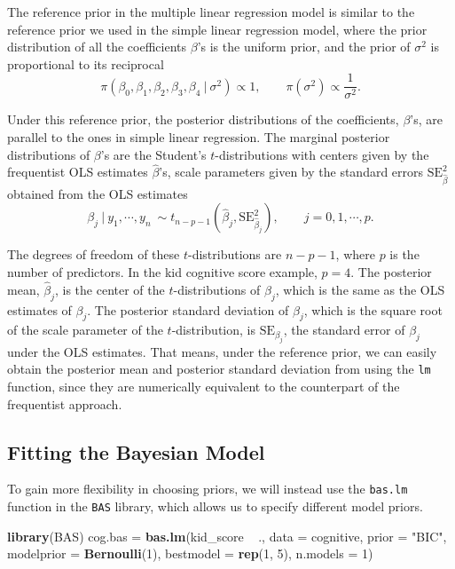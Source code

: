 \documentclass[]{book}
\newenvironment{Shaded}{\begin{snugshade}}{\end{snugshade}}
\newcommand{\KeywordTok}[1]{\textcolor[rgb]{0.13,0.29,0.53}{\textbf{{#1}}}}
\newcommand{\DataTypeTok}[1]{\textcolor[rgb]{0.13,0.29,0.53}{{#1}}}
\newcommand{\DecValTok}[1]{\textcolor[rgb]{0.00,0.00,0.81}{{#1}}}
\newcommand{\StringTok}[1]{\textcolor[rgb]{0.31,0.60,0.02}{{#1}}}
\newcommand{\NormalTok}[1]{{#1}}
\theoremstyle{definition}
\theoremstyle{definition}
\theoremstyle{definition}
\theoremstyle{remark}
\begin{document}
The reference prior in the multiple linear regression model is similar
to the reference prior we used in the simple linear regression model,
where the prior distribution of all the coefficients \(\beta\)'s is the
uniform prior, and the prior of \(\sigma^2\) is proportional to its
reciprocal
\[ \pi(\beta_0,\beta_1,\beta_2,\beta_3,\beta_4~|~\sigma^2) \propto 1,\qquad \pi(\sigma^2) \propto \frac{1}{\sigma^2}. \]

Under this reference prior, the posterior distributions of the
coefficients, \(\beta\)'s, are parallel to the ones in simple linear
regression. The marginal posterior distributions of \(\beta\)'s are the
Student's \(t\)-distributions with centers given by the frequentist OLS
estimates \(\hat{\beta}\)'s, scale parameters given by the standard
errors \(\text{SE}_{\hat{\beta}}^2\) obtained from the OLS estimates \[
\beta_j~|~y_1,\cdots,y_n\ \sim t_{n-p-1}(\hat{\beta}_j, \text{SE}_{\hat{\beta}_j}^2),\qquad j = 0, 1, \cdots, p.
\]

The degrees of freedom of these \(t\)-distributions are \(n-p-1\), where
\(p\) is the number of predictors. In the kid cognitive score example,
\(p=4\). The posterior mean, \(\hat{\beta}_j\), is the center of the
\(t\)-distributions of \(\beta_j\), which is the same as the OLS
estimates of \(\beta_j\). The posterior standard deviation of
\(\beta_j\), which is the square root of the scale parameter of the
\(t\)-distribution, is \(\text{SE}_{\beta_j}\), the standard error of
\(\beta_j\) under the OLS estimates. That means, under the reference
prior, we can easily obtain the posterior mean and posterior standard
deviation from using the \texttt{lm} function, since they are
numerically equivalent to the counterpart of the frequentist approach.

\subsection{Fitting the Bayesian
Model}\label{fitting-the-bayesian-model}

To gain more flexibility in choosing priors, we will instead use the
\texttt{bas.lm} function in the \texttt{BAS} library, which allows us to
specify different model priors.

\begin{Shaded}
\begin{Highlighting}[]
\KeywordTok{library}\NormalTok{(BAS)}
\NormalTok{cog.bas =}\StringTok{ }\KeywordTok{bas.lm}\NormalTok{(kid_score ~}\StringTok{ }\NormalTok{., }\DataTypeTok{data =} \NormalTok{cognitive, }\DataTypeTok{prior =} \StringTok{"BIC"}\NormalTok{, }
                 \DataTypeTok{modelprior =} \KeywordTok{Bernoulli}\NormalTok{(}\DecValTok{1}\NormalTok{), }\DataTypeTok{bestmodel =} \KeywordTok{rep}\NormalTok{(}\DecValTok{1}\NormalTok{, }\DecValTok{5}\NormalTok{), }\DataTypeTok{n.models =} \DecValTok{1}\NormalTok{)}
\end{Highlighting}
\end{Shaded}
\end{document}
